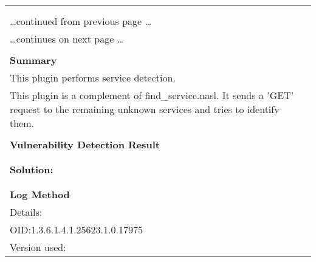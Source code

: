 \documentclass{article}
\begin{document}
\begin{longtable}{|p{}|}
\hline
\rowcolor{gvm_log}{\color{white}{Log (CVSS: 0.0) }}\\
\rowcolor{gvm_log}{\color{white}{NVT: Service Detection with 'GET' Request}}\\
\hline
\endfirsthead
\hfill\ldots continued from previous page \ldots \\
\hline
\endhead
\hline
\ldots continues on next page \ldots \\
\endfoot
\hline
\endlastfoot
\\
\textbf{Summary}\\
This plugin performs service detection.\\
  This plugin is a complement of find\_service.nasl. It sends a 'GET' request
  to the remaining unknown services and tries to identify them.\\

        \hline
        \\
\textbf{Vulnerability Detection Result}\\
\rowcolor{white}{\verb=A service supporting the SIP protocol seems to be running on this port.=}\\

          \hline
          \\
\textbf{Solution:}\\
\\


        \hline
        \\
\textbf{Log Method}\\
Details:
\rowcolor{white}{\verb=Service Detection with 'GET' Request=}\\
OID:1.3.6.1.4.1.25623.1.0.17975\\
Version used:
\rowcolor{white}{\verb=2022-02-01T12:51:06Z=}\\
\end{longtable}
\end{document}
